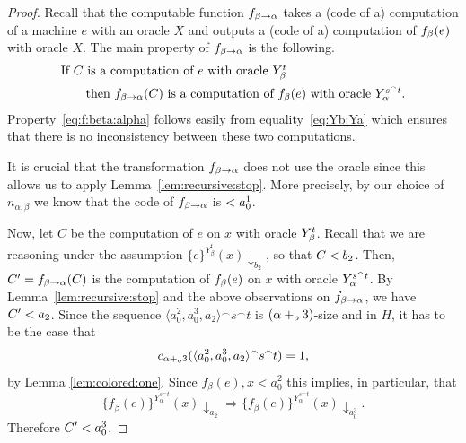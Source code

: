 \documentclass[11pt]{amsart}
\theoremstyle{definition}
\theoremstyle{remark}
\theoremstyle{plain}
\def\la{\langle}
\def\ra{\rangle}
\def\a{\alpha}
\def\b{\beta}
\def\conc{{}^\smallfrown}
\def\stops{{\downarrow}}
\newcommand{\pluso}{+\sb{o}}
\def\stops{{\downarrow}}
\begin{document}
\begin{proof}
Recall that the computable function $f\sb{\beta\rightarrow \alpha}$ takes a (code of a) computation of a machine $e$ with an oracle $X$ and outputs a (code of a) computation of $f\sb{\beta}(e)$ with oracle $X$. 
The main property of $f\sb{\beta\rightarrow \alpha}$ is the following.
\begin{equation}\label{eq:f:beta:alpha}
\begin{split}
\lefteqn{\mbox{If $C$ is a computation of $e$ with oracle $Y\sb \beta \sp t$}}&\\
&\mbox{\ \ \ \ \ \ then $f\sb{\beta\rightarrow \alpha}(C)$ is a computation of $f\sb \beta(e)$ with oracle $Y\sb \alpha \sp {s \conc t}$}.
\end{split}
\end{equation}
Property~\eqref{eq:f:beta:alpha} follows easily from equality~\eqref{eq:Yb:Ya} which ensures that there is no inconsistency between  these two computations.  

It is crucial that the transformation $f\sb{\beta\rightarrow \alpha}$ does not use the oracle since this allows us to apply Lemma~\ref{lem:recursive:stop}. 
More precisely, by our choice of $n_{\a,\b}$ we know that the code of $f\sb{\beta \rightarrow \alpha}$ is $<a\sp{1}\sb 0$.

Now, let $C$ be the computation of $e$ on $x$ with oracle $Y\sb \beta \sp t$. 
Recall that we are reasoning under the assumption $\{e\}^{Y_\beta^t}(x) \stops_{b_2}$, so that $C<b\sb 2$.
Then, $C'=f\sb{\beta\rightarrow \alpha}(C)$ is the computation of $f\sb \beta(e)$ on $x$ with oracle $Y\sb \alpha \sp {s \conc t}$. 
By Lemma~\ref{lem:recursive:stop} and the above observations on $f\sb{\beta \rightarrow \alpha}$, we have $C'<a\sb 2$. 
Since the sequence $\la a^2_0, a^3_0, a_2\ra \conc s \conc t$ is $(\alpha \pluso 3)$-size and in $H$, it has to be the case that 
$$ c_{\alpha \pluso 3}(\la a^2_0, a^3_0, a_2\ra \conc s \conc t) = 1,$$
by Lemma \ref{lem:colored:one}. 
Since $f_\beta(e), x < a^2_0$ this implies, in particular, that
$$\{f_\beta(e)\}^{Y_\a^{s\conc t}}(x)\stops_{a_2} \Rightarrow \{f_\beta(e)\}^{Y_\a^{s\conc t}}(x)\stops_{a^3_0}.$$
Therefore $C'<a\sp{3}\sb 0$. 


\end{proof}
\end{document}
